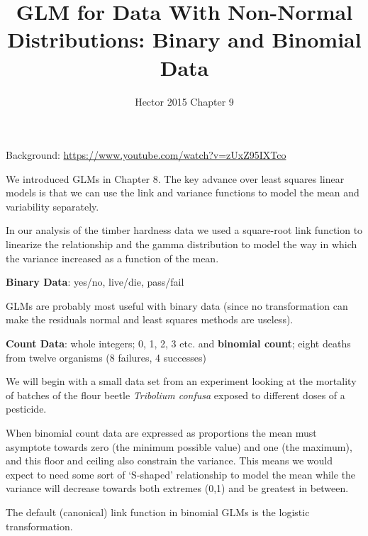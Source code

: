\documentclass[
]{article}
\title{GLM for Data With Non-Normal Distributions: Binary and Binomial
Data}
\subtitle{Hector 2015 Chapter 9}
\author{}
\date{\vspace{-2.5em}}
\newenvironment{Shaded}{\begin{snugshade}}{\end{snugshade}}
\newcommand{\CommentTok}[1]{\textcolor[rgb]{0.56,0.35,0.01}{\textit{#1}}}
\newcommand{\FunctionTok}[1]{\textcolor[rgb]{0.00,0.00,0.00}{#1}}
\newcommand{\NormalTok}[1]{#1}
\newcommand{\OtherTok}[1]{\textcolor[rgb]{0.56,0.35,0.01}{#1}}
\newcommand{\SpecialCharTok}[1]{\textcolor[rgb]{0.00,0.00,0.00}{#1}}
\begin{document}
\maketitle

{
\setcounter{tocdepth}{2}
\tableofcontents
}
Background: \url{https://www.youtube.com/watch?v=zUxZ95IXTco}

We introduced GLMs in Chapter 8. The key advance over least squares
linear models is that we can use the link and variance functions to
model the mean and variability separately.

In our analysis of the timber hardness data we used a square-root link
function to linearize the relationship and the gamma distribution to
model the way in which the variance increased as a function of the mean.

\textbf{Binary Data}: yes/no, live/die, pass/fail

GLMs are probably most useful with binary data (since no transformation
can make the residuals normal and least squares methods are useless).

\textbf{Count Data}: whole integers; 0, 1, 2, 3 etc. and
\textbf{binomial count}; eight deaths from twelve organisms (8 failures,
4 successes)

We will begin with a small data set from an experiment looking at the
mortality of batches of the flour beetle \emph{Tribolium confusa}
exposed to different doses of a pesticide.

\begin{Shaded}
\end{Shaded}

When binomial count data are expressed as proportions the mean must
asymptote towards zero (the minimum possible value) and one (the
maximum), and this floor and ceiling also constrain the variance. This
means we would expect to need some sort of `S-shaped' relationship to
model the mean while the variance will decrease towards both extremes
(0,1) and be greatest in between.

The default (canonical) link function in binomial GLMs is the logistic
transformation.
\end{document}
